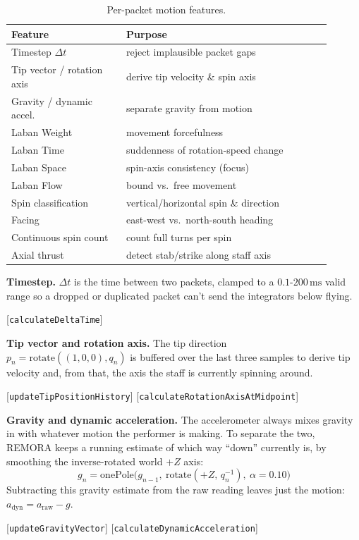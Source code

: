 \documentclass[sigconf,nonacm]{acmart}
\newcommand{\coderef}[1]{{\small [#1]}}
\begin{document}
\begin{table}[htbp]
\centering
\small
\caption{Per-packet motion features.}
\label{tab:motion-features}
\begin{tabular}{@{}p{0.32\linewidth}p{0.58\linewidth}@{}}
\toprule
Feature & Purpose \\
\midrule
Timestep $\Delta t$ & reject implausible packet gaps \\
Tip vector / rotation axis & derive tip velocity \& spin axis \\
Gravity / dynamic accel. & separate gravity from motion \\
Laban Weight & movement forcefulness \\
Laban Time & suddenness of rotation-speed change \\
Laban Space & spin-axis consistency (focus) \\
Laban Flow & bound vs.\ free movement \\
Spin classification & vertical/horizontal spin \& direction \\
Facing & east-west vs.\ north-south heading \\
Continuous spin count & count full turns per spin \\
Axial thrust & detect stab/strike along staff axis \\
\bottomrule
\end{tabular}
\end{table}

\textbf{Timestep.} $\Delta t$ is the time between two packets, clamped to a $0.1$-$200\,\text{ms}$
valid range so a dropped or duplicated packet can't send the integrators below flying.
\begin{flushright}
\coderef{\texttt{calculateDeltaTime}}
\end{flushright}

\textbf{Tip vector and rotation axis.} The tip direction\\ $p_n = \mathrm{rotate}((1,0,0), q_n)$ is
buffered over the last three samples to derive tip velocity and, from that, the axis the staff is
currently spinning around.
\begin{flushright}
\coderef{\texttt{updateTipPositionHistory}}
\coderef{\texttt{calculateRotationAxisAtMidpoint}}
\end{flushright}

\textbf{Gravity and dynamic acceleration.} The accelerometer always mixes gravity in with whatever
motion the performer is making. To separate the two, REMORA keeps a running estimate of which way
``down'' currently is, by smoothing the inverse-rotated world $+Z$ axis:
\[
g_n = \mathrm{onePole}\big(g_{n-1},\ \mathrm{rotate}(+Z,\, q_n^{-1}),\ \alpha{=}0.10\big)
\]
Subtracting this gravity estimate from the raw reading leaves just the motion: $a_{\text{dyn}} =
a_{\text{raw}} - g$.
\begin{flushright}
\coderef{\texttt{updateGravityVector}}
\coderef{\texttt{calculateDynamicAcceleration}}
\end{flushright}
\end{document}
